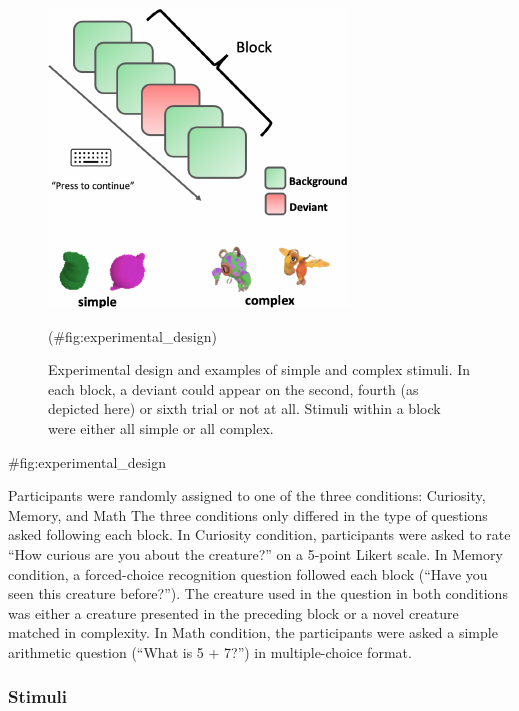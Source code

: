 \documentclass[10pt, letterpaper]{article}
\newenvironment{CodeChunk}{}{}
\begin{document}
\begin{CodeChunk}
\begin{figure}[H]

{\centering \includegraphics{figs/experimental_design-1} 

}

\caption[Experimental design and examples of simple and complex stimuli]{Experimental design and examples of simple and complex stimuli. In each block, a deviant could appear on the second, fourth (as depicted here) or sixth trial or not at all. Stimuli within a block were either all simple or all complex.}(\#fig:experimental_design)
\end{figure}
\begin{CodeOutput}
{#fig:experimental_design}
\end{CodeOutput}
\end{CodeChunk}

Participants were randomly assigned to one of the three conditions: Curiosity, Memory, and Math The three conditions only differed in the type of questions asked following each block. In Curiosity condition, participants were asked to rate ``How curious are you about the creature?'' on a 5-point Likert scale. In Memory condition, a forced-choice recognition question followed each block (``Have you seen this creature before?''). The creature used in the question in both conditions was either a creature presented in the preceding block or a novel creature matched in complexity. In Math condition, the participants were asked a simple arithmetic question (``What is 5 + 7?'') in multiple-choice format.

\hypertarget{stimuli}{%
\subsubsection{Stimuli}\label{stimuli}}
\end{document}
